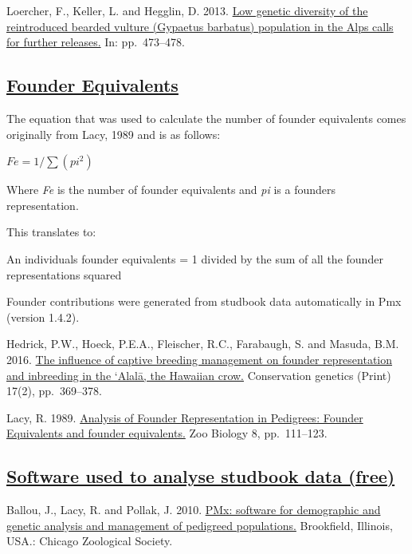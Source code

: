 \documentclass[12pt,]{article}
\begin{document}
Loercher, F., Keller, L. and Hegglin, D. 2013.
\href{http://www.swild.ch/publi/Loercher_5thSymResProAre2013.pdf}{Low genetic diversity of the reintroduced bearded vulture (Gypaetus barbatus) population in the Alps calls for further releases.}
In: pp.~473--478.\newline

\subsection{\underline{\textbf{Founder Equivalents}}}

The equation that was used to calculate the number of founder
equivalents comes originally from Lacy, 1989 and is as follows:

\(Fe = 1/\sum(pi^2)\)

Where \emph{Fe} is the number of founder equivalents and \emph{pi} is a
founders representation.

This translates to:

An individuals founder equivalents = 1 divided by the sum of all the
founder representations squared

Founder contributions were generated from studbook data automatically in
Pmx (version 1.4.2).

Hedrick, P.W., Hoeck, P.E.A., Fleischer, R.C., Farabaugh, S. and Masuda,
B.M. 2016.
\href{https://link.springer.com/article/10.1007/s10592-015-0788-z}{The influence of captive breeding management on founder representation and inbreeding in the ‘Alalā, the Hawaiian crow.}
Conservation genetics (Print) 17(2), pp.~369--378.\newline

Lacy, R. 1989.
\href{https://onlinelibrary.wiley.com/doi/abs/10.1002/zoo.1430080203}{Analysis of Founder Representation in Pedigrees: Founder Equivalents and founder equivalents.}
Zoo Biology 8, pp.~111--123.\newline

\subsection{\underline{\textbf{Software used to analyse studbook data (free)}}}

Ballou, J., Lacy, R. and Pollak, J. 2010.
\href{https://besjournals.onlinelibrary.wiley.com/doi/full/10.1111/j.2041-210X.2011.00148.x}{PMx: software for demographic and genetic analysis and management of pedigreed populations.}
Brookfield, Illinois, USA.: Chicago Zoological Society.
\end{document}
